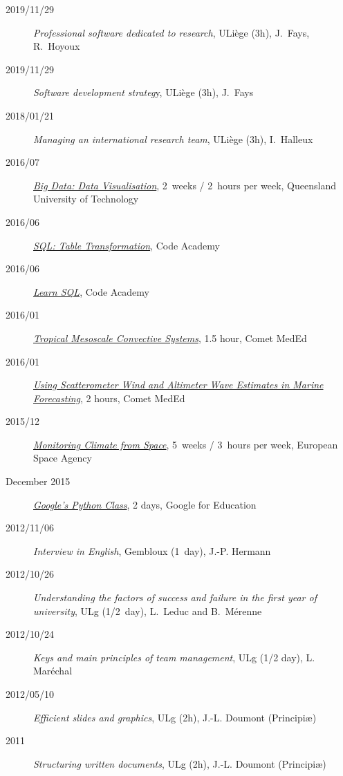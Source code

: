 \documentclass[11pt,a4paper,svgnames]{article}
\begin{document}
\begin{description}
\item[2019/11/29]{\textit{Professional software dedicated to research}, ULiège (3h), J.~Fays, R.~Hoyoux}
\item[2019/11/29]{\textit{Software development strateg}y, ULiège (3h), J.~Fays}
\item[2018/01/21]{\textit{Managing an international research team}, ULiège (3h), I.~Halleux}
\item[2016/07]{\href{https://www.futurelearn.com/courses/big-data-visualisation}{\textit{Big Data: Data Visualisation}}, 2~weeks / 2~hours per week, Queensland University of Technology}
\item[2016/06]{\href{https://www.codecademy.com/learn/sql-table-transformation}{\textit{SQL: Table Transformation}}, Code Academy}
\item[2016/06]{\href{https://www.codecademy.com/learn/learn-sql}{\textit{Learn SQL}}, Code Academy}
\item[2016/01]{\href{https://www.meted.ucar.edu/training_module.php?id=993}{\textit{Tropical Mesoscale Convective Systems}}, 1.5 hour, Comet MedEd}
\item[2016/01]{\href{https://www.meted.ucar.edu/training_module.php?id=1093}{\textit{Using Scatterometer Wind and Altimeter Wave Estimates in Marine Forecasting}}, 2 hours, Comet MedEd}
\item[2015/12]{\href{https://www.futurelearn.com/courses/climate-from-space}{\textit{Monitoring Climate from Space}}, 5~weeks / 3~hours per week, European Space Agency}
\item[December 2015]{\href{https://developers.google.com/edu/python/?hl=en}{\textit{Google's Python Class}}, 2 days, Google for Education}
\item[2012/11/06]{\textit{Interview in English}, Gembloux (1~day), J.-P. Hermann}
\item[2012/10/26]{\textit{Understanding the factors of success and failure in the first year of university}, ULg (1/2~day), L.~Leduc and B.~M\'{e}renne}
\item[2012/10/24]{\textit{Keys and main principles of team management}, ULg  (1/2 day), L. Mar\'{e}chal}
\item[2012/05/10]{\textit{Efficient slides and graphics}, ULg (2h), J.-L. Doumont (Principi\ae)}

\item[2011]{\textit{Structuring written documents}, ULg (2h), J.-L. Doumont (Principi\ae)}
\end{description}
\end{document}
